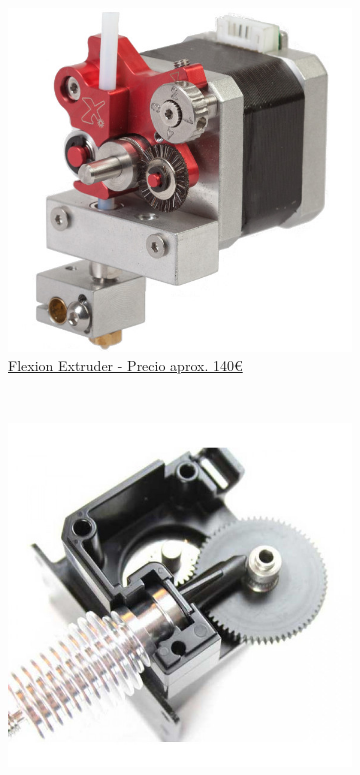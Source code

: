 \documentclass[11pt,a4paper]{article}
\begin{document}
\begin{figure}[H]
    \centering
    ~ %
    \begin{subfigure}[b]{0.4\textwidth}
        \includegraphics[width=\textwidth,cfbox=azul_marcos 4pt 0pt]{FOTOS/EXTRUSOR7}
		\caption*{\href{https://flexionextruder.com/}{{\footnotesize Flexion Extruder - Precio aprox. 140\euro}}}
    \end{subfigure}
    ~ \qquad %
    \begin{subfigure}[b]{0.4\textwidth}
        \includegraphics[width=\textwidth,cfbox=azul_marcos 4pt 0pt]{FOTOS/EXTRUSOR8}

\end{subfigure}
\end{figure}
\end{document}
